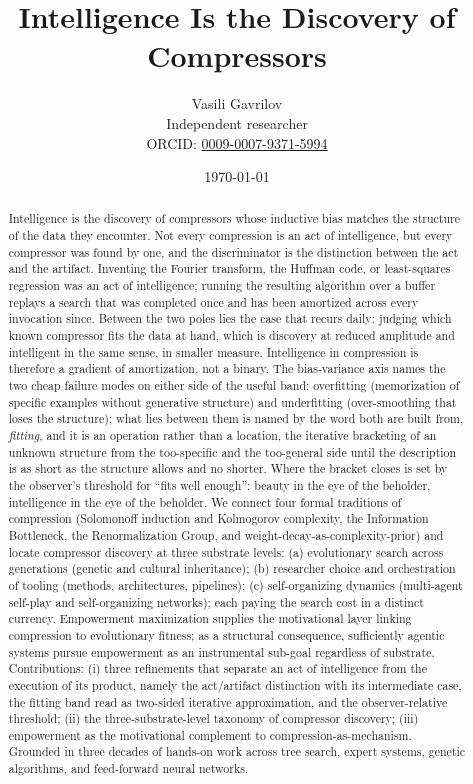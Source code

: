 \documentclass[11pt]{article}
\title{Intelligence Is the Discovery of Compressors}
\author{Vasili Gavrilov\\
\small Independent researcher\\
\small ORCID: \href{https://orcid.org/0009-0007-9371-5994}{0009-0007-9371-5994}}
\date{\today}
\begin{document}
\maketitle

\begin{abstract}
Intelligence is the discovery of compressors whose inductive bias matches the structure of the data they encounter. Not every compression is an act of intelligence, but every compressor was found by one, and the discriminator is the distinction between the act and the artifact. Inventing the Fourier transform, the Huffman code, or least-squares regression was an act of intelligence; running the resulting algorithm over a buffer replays a search that was completed once and has been amortized across every invocation since. Between the two poles lies the case that recurs daily: judging which known compressor fits the data at hand, which is discovery at reduced amplitude and intelligent in the same sense, in smaller measure. Intelligence in compression is therefore a gradient of amortization, not a binary. The bias-variance axis names the two cheap failure modes on either side of the useful band: overfitting (memorization of specific examples without generative structure) and underfitting (over-smoothing that loses the structure); what lies between them is named by the word both are built from, \emph{fitting}, and it is an operation rather than a location, the iterative bracketing of an unknown structure from the too-specific and the too-general side until the description is as short as the structure allows and no shorter. Where the bracket closes is set by the observer's threshold for ``fits well enough'': beauty in the eye of the beholder, intelligence in the eye of the beholder. We connect four formal traditions of compression (Solomonoff induction and Kolmogorov complexity, the Information Bottleneck, the Renormalization Group, and weight-decay-as-complexity-prior) and locate compressor discovery at three substrate levels: (a) evolutionary search across generations (genetic and cultural inheritance); (b) researcher choice and orchestration of tooling (methods, architectures, pipelines); (c) self-organizing dynamics (multi-agent self-play and self-organizing networks); each paying the search cost in a distinct currency. Empowerment maximization supplies the motivational layer linking compression to evolutionary fitness; as a structural consequence, sufficiently agentic systems pursue empowerment as an instrumental sub-goal regardless of substrate. Contributions: (i) three refinements that separate an act of intelligence from the execution of its product, namely the act/artifact distinction with its intermediate case, the fitting band read as two-sided iterative approximation, and the observer-relative threshold; (ii) the three-substrate-level taxonomy of compressor discovery; (iii) empowerment as the motivational complement to compression-as-mechanism. Grounded in three decades of hands-on work across tree search, expert systems, genetic algorithms, and feed-forward neural networks.
\end{abstract}
\end{document}

